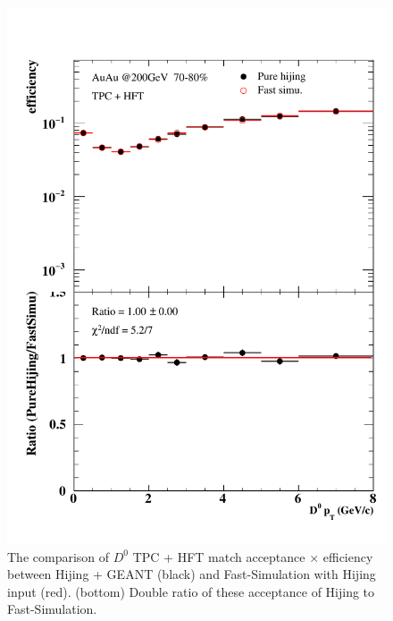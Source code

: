 \begin{figure}[htbp]
\begin{minipage}[htbp]{0.47\linewidth}
\centering
\includegraphics[width=1.0\textwidth,angle=0]{figure/Run14_D0HFT/70_80_2.pdf}
\caption{ The comparison of $D^0$ TPC + HFT match acceptance $\times$ efficiency between Hijing + GEANT (black) and Fast-Simulation with Hijing input (red). (bottom) Double ratio of these acceptance of Hijing to Fast-Simulation.\label{70_80_2}}
\end{minipage}
\hfill
\begin{minipage}[htbp]{0.47\linewidth}
\centering

\end{minipage}
\end{figure}
